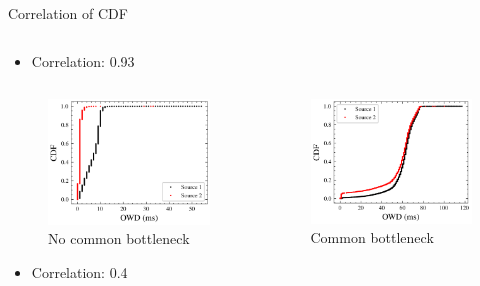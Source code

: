 \documentclass[presentation]{beamer}
\begin{document}
\begin{frame}[allowframebreaks,label=]{Correlation of CDF}
\begin{columns}
\begin{column}{.56\columnwidth}
\begin{itemize}
\item Correlation: 0.93
\end{itemize}
\end{column}
\end{columns}
\framebreak
\begin{columns}
\begin{column}{.56\columnwidth}
\begin{figure}[htbp]
\centering
\includegraphics[width=.9\linewidth]{figures/presentation/correlation-owd-nocommon.png}
\caption{\label{fig:org98441fd}No common bottleneck}
\end{figure}

\begin{itemize}
\item Correlation: 0.4
\end{itemize}
\end{column}
\begin{column}{.56\columnwidth}
\begin{figure}[htbp]
\centering
\includegraphics[width=.9\linewidth]{figures/presentation/correlation-owd-common.png}
\caption{\label{fig:org3d18c1c}Common bottleneck}
\end{figure}


\end{column}
\end{columns}
\end{frame}
\end{document}
